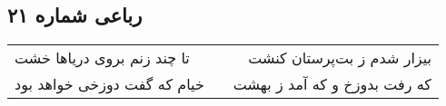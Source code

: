 \begin{center}
\section*{رباعی شماره ۲۱}
\label{sec:sh021}
\begin{longtable}{l p{0.5cm} r}
تا چند زنم بروی دریاها خشت
&&
بیزار شدم ز بت‌پرستان کنشت
\\
خیام که گفت دوزخی خواهد بود
&&
که رفت بدوزخ و که آمد ز بهشت
\\
\end{longtable}
\end{center}
